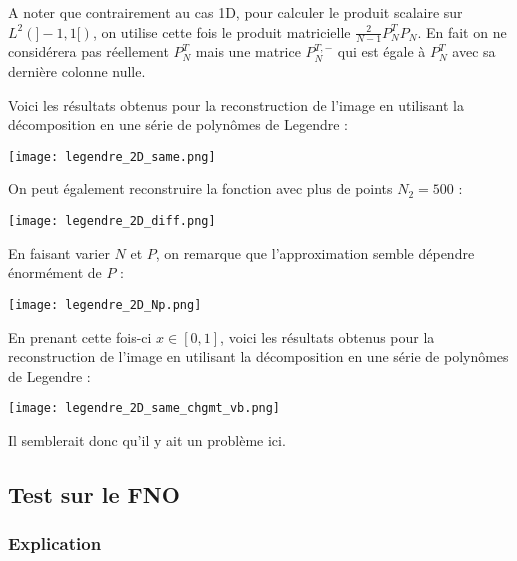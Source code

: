 \begin{Rem}
	A noter que contrairement au cas 1D, pour calculer le produit scalaire sur $L^2(]-1,1[)$, on utilise cette fois le produit matricielle $\frac{2}{N-1}P_N^TP_N$. En fait on ne considérera pas réellement $P_N^T$ mais une matrice $P_N^{T,-}$ qui est égale à $P_N^T$ avec sa dernière colonne nulle.
\end{Rem}

Voici les résultats obtenus pour la reconstruction de l'image en utilisant la décomposition en une série de polynômes de Legendre :

\begin{minipage}{\linewidth}
	\centering
	\texttt{[image: legendre\_2D\_same.png]}
\end{minipage}

\newpage

On peut également reconstruire la fonction avec plus de points $N_2=500$ :

\begin{minipage}{\linewidth}
	\centering
	\texttt{[image: legendre\_2D\_diff.png]}
\end{minipage}

En faisant varier $N$ et $P$, on remarque que l'approximation semble dépendre énormément de $P$ :

\begin{minipage}{\linewidth}
	\centering
	\texttt{[image: legendre\_2D\_Np.png]}
\end{minipage}


En prenant cette fois-ci $x\in[0,1]$, voici les résultats obtenus pour la reconstruction de l'image en utilisant la décomposition en une série de polynômes de Legendre :

\begin{minipage}{\linewidth}
	\centering
	\texttt{[image: legendre\_2D\_same\_chgmt\_vb.png]}
\end{minipage}

Il semblerait donc qu'il y ait un problème ici.

\subsection{Test sur le FNO}

\subsubsection{Explication}

